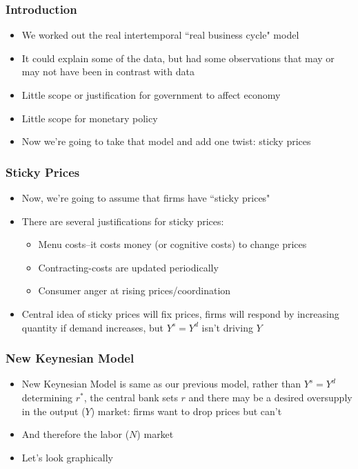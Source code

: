 \documentclass{beamer}
\author{Trevor S. Gallen}
\date{}
\begin{document}
\renewcommand*{\inserttotalframenumber}{\pageref{lastframe}}



\begin{frame}
\titlepage
\end{frame}

\begin{frame}
\frametitle[alignment=center]{Introduction}
\begin{itemize}
\item We worked out the real intertemporal ``real business cycle" model
\bigskip
\item It could explain some of the data, but had some observations that may or may not have been in contrast with data
\bigskip
\item Little scope or justification for government to affect economy
\bigskip
\item Little scope for monetary policy
\bigskip
\item Now we're going to take that model and add one twist:  sticky prices
\end{itemize}
\end{frame}

\begin{frame}
\frametitle[alignment=center]{Sticky Prices}
\begin{itemize}
\item Now, we're going to assume that firms have ``sticky prices"
\bigskip
\item There are several justifications for sticky prices:
\bigskip
\begin{itemize}
\item Menu costs--it costs money (or cognitive costs) to change prices
\bigskip
\item Contracting-costs are updated periodically
\bigskip
\item Consumer anger at rising prices/coordination
\end{itemize}
\bigskip
\item Central idea of sticky prices will fix prices, firms will respond by increasing quantity if demand increases, but $Y^s=Y^d$ isn't driving $Y$
\end{itemize}
\end{frame}

\begin{frame}
\frametitle[alignment=center]{New Keynesian Model}
\begin{itemize}
\item New Keynesian Model is same as our previous model, rather than $Y^s=Y^d$ determining $r^*$, the central bank sets $r$ and there may be a desired oversupply  in the output ($Y$) market: firms want to drop prices but can't
\bigskip
\item And therefore the labor ($N$) market 
\bigskip
\item Let's look graphically
\end{itemize}
\end{frame}
\end{document}
